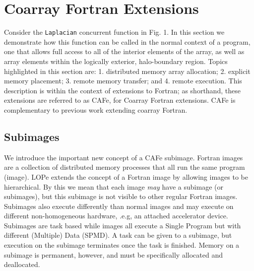 \section{Coarray Fortran Extensions}


Consider the \texttt{Laplacian} concurrent function in Fig. 1.  In this section we demonstrate how
this function can be called in the normal context of a program, one that allows full access to all
of the interior elements of the array, as well as array elements within the logically exterior,
halo-boundary region.  Topics highlighted in this section are: 1. distributed memory array
allocation; 2. explicit memory placement; 3. remote memory transfer; and 4. remote execution.  This
description is within the context of extensions to Fortran; as shorthand, these extensions are
referred to as CAFe, for Coarray Fortran extensions.  CAFe is complementary to previous work
extending coarray Fortran\cite{mellor-crummey:2009:caf2,jin:2011:caf2}.

\subsection{Subimages}

We introduce the important new concept of a CAFe subimage.  Fortran images are a collection of
distributed memory processes that all run the same program (image).  LOPe extends the concept of a
Fortran image by allowing images to be hierarchical.  By this we mean that each image \emph{may}
have a subimage (or subimages), but this subimage is not visible to other regular Fortran images.
Subimages also execute differently than normal images and may execute on different non-homogeneous
hardware, .e.g, an attached accelerator device.  Subimages are task based while images all execute
a Single Program but with different (Multiple) Data (SPMD).  A task can be given to a subimage, but
execution on the subimage terminates once the task is finished.  Memory on a subimage is permanent,
however, and must be specifically allocated and deallocated.

